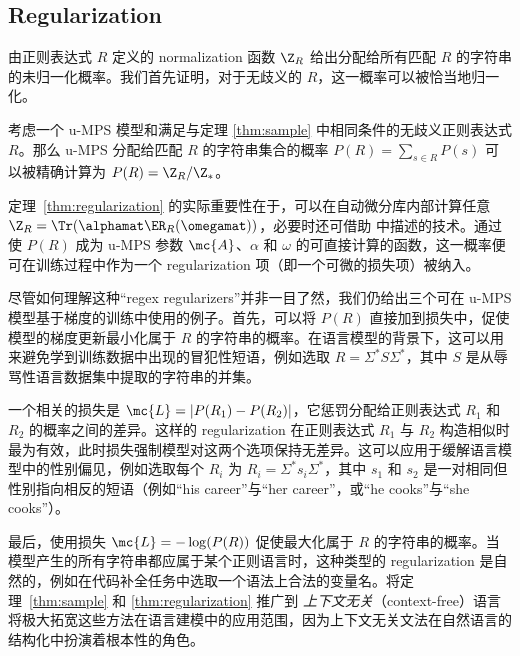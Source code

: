 \subsection{Regularization}

由正则表达式 $R$ 定义的 normalization 函数 $\Z_{R}$ 给出分配给所有匹配 $R$ 的字符串的未归一化概率。我们首先证明，对于无歧义的 $R$，这一概率可以被恰当地归一化。
%
\begin{theorem}
\label{thm:regularization}
考虑一个 u-MPS 模型和满足与定理 \ref{thm:sample} 中相同条件的无歧义正则表达式 $R$。那么 u-MPS 分配给匹配 $R$ 的字符串集合的概率 $P(R) = \sum_{s \in R} P(s)$ 可以被精确计算为 $P(R) = \Z_R / \Z_*$。
\end{theorem}
%
定理~\ref{thm:regularization} 的实际重要性在于，可以在自动微分库内部计算任意 $\Z_R = \Tr(\alphamat \ER_R(\omegamat))$，必要时还可借助 \citep{liao2019} 中描述的技术。通过使 $P(R)$ 成为 u-MPS 参数 $\mc{A}$、$\alpha$ 和 $\omega$ 的可直接计算的函数，这一概率便可在训练过程中作为一个 regularization 项（即一个可微的损失项）被纳入。

尽管如何理解这种``regex regularizers''并非一目了然，我们仍给出三个可在 u-MPS 模型基于梯度的训练中使用的例子。首先，可以将 $P(R)$ 直接加到损失中，促使模型的梯度更新最小化属于 $R$ 的字符串的概率。在语言模型的背景下，这可以用来避免学到训练数据中出现的冒犯性短语，例如选取 $R = \Sigma^* S \Sigma^*$，其中 $S$ 是从辱骂性语言数据集中提取的字符串的并集。

一个相关的损失是 $\mc{L} = |P(R_1) - P(R_2)|$，它惩罚分配给正则表达式 $R_1$ 和 $R_2$ 的概率之间的差异。这样的 regularization 在正则表达式 $R_1$ 与 $R_2$ 构造相似时最为有效，此时损失强制模型对这两个选项保持无差异。这可以应用于缓解语言模型中的性别偏见，例如选取每个 $R_i$ 为 $R_i = \Sigma^* s_i \Sigma^*$，其中 $s_1$ 和 $s_2$ 是一对相同但性别指向相反的短语（例如``his career''与``her career''，或``he cooks''与``she cooks''）。

最后，使用损失 $\mc{L} = -\log(P(R))$ 促使最大化属于 $R$ 的字符串的概率。当模型产生的所有字符串都应属于某个正则语言时，这种类型的 regularization 是自然的，例如在代码补全任务中选取一个语法上合法的变量名。将定理~\ref{thm:sample} 和 \ref{thm:regularization} 推广到 \emph{上下文无关}（context-free）语言将极大拓宽这些方法在语言建模中的应用范围，因为上下文无关文法在自然语言的结构化中扮演着根本性的角色。

